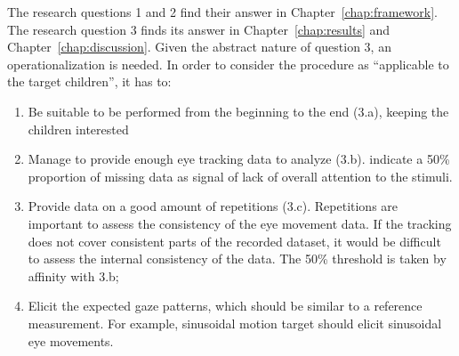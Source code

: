 The research questions 1 and 2 find their answer in Chapter~\ref{chap:framework}. The research question 3 finds its answer in Chapter~\ref{chap:results} and Chapter~\ref{chap:discussion}. Given the abstract nature of question 3, an operationalization is needed. In order to consider the procedure as “applicable to the target children”, it has to:
\begin{enumerate}
    \item Be suitable to be performed from the beginning to the end (3.a), keeping the children interested
    \item Manage to provide enough eye tracking data to analyze (3.b). \cite{sasson2012children} indicate a 50\% proportion of missing data as signal of lack of overall attention to the stimuli.
    \item Provide data on a good amount of repetitions (3.c). Repetitions are important to assess the consistency of the eye movement data. If the tracking does not cover consistent parts of the recorded dataset, it would be difficult to assess the internal consistency of the data. The 50\% threshold is taken by affinity with 3.b;
    \item Elicit the expected gaze patterns, which should be similar to a reference measurement. For example, sinusoidal motion target should elicit sinusoidal eye movements.
\end{enumerate}


